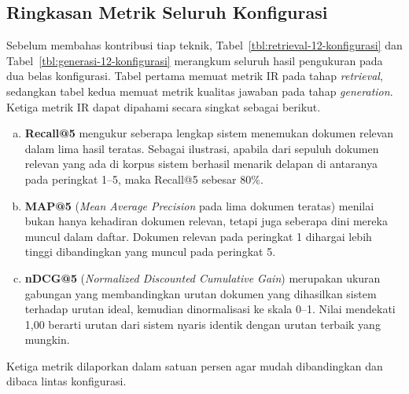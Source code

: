 \subsection{Ringkasan Metrik Seluruh Konfigurasi}
\label{subsec:ringkasan-metrik}

Sebelum membahas kontribusi tiap teknik, Tabel~\ref{tbl:retrieval-12-konfigurasi} dan Tabel~\ref{tbl:generasi-12-konfigurasi} merangkum seluruh hasil pengukuran pada dua belas konfigurasi. Tabel pertama memuat metrik IR pada tahap \textit{retrieval}, sedangkan tabel kedua memuat metrik kualitas jawaban pada tahap \textit{generation}. Ketiga metrik IR dapat dipahami secara singkat sebagai berikut.

\begin{enumerate}[a.]
\item \textbf{Recall@5} mengukur seberapa lengkap sistem menemukan dokumen relevan dalam lima hasil teratas. Sebagai ilustrasi, apabila dari sepuluh dokumen relevan yang ada di korpus sistem berhasil menarik delapan di antaranya pada peringkat 1--5, maka Recall@5 sebesar 80\%.
\item \textbf{MAP@5} (\textit{Mean Average Precision} pada lima dokumen teratas) menilai bukan hanya kehadiran dokumen relevan, tetapi juga seberapa dini mereka muncul dalam daftar. Dokumen relevan pada peringkat 1 dihargai lebih tinggi dibandingkan yang muncul pada peringkat 5.
\item \textbf{nDCG@5} (\textit{Normalized Discounted Cumulative Gain}) merupakan ukuran gabungan yang membandingkan urutan dokumen yang dihasilkan sistem terhadap urutan ideal, kemudian dinormalisasi ke skala 0--1. Nilai mendekati 1{,}00 berarti urutan dari sistem nyaris identik dengan urutan terbaik yang mungkin.
\end{enumerate}

Ketiga metrik dilaporkan dalam satuan persen agar mudah dibandingkan dan dibaca lintas konfigurasi.

